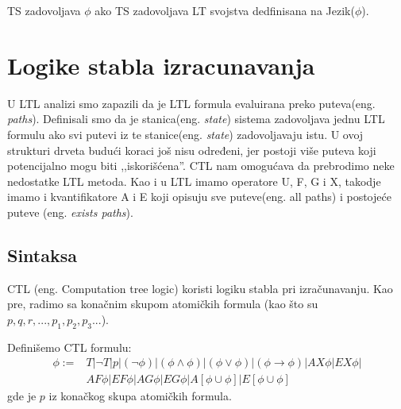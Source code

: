 \documentclass[a4paper]{article}
\begin{document}
{	TS zadovoljava $\phi$ ako TS zadovoljava LT svojstva dedfinisana na Jezik($\phi$).


	\section{Logike stabla izracunavanja}
	\label{sec:CTL}
	U LTL analizi smo zapazili da je LTL formula evaluirana preko puteva(eng. \emph{paths}). Definisali smo da je stanica(eng. \emph{state}) sistema
	zadovoljava jednu LTL formulu ako svi putevi iz te stanice(eng. \emph{state}) zadovoljavaju istu. U ovoj strukturi drveta budući koraci još nisu
	određeni, jer postoji više puteva koji potencijalno mogu biti ,,iskorišćena''.
	CTL nam omogućava da prebrodimo neke nedostatke LTL metoda. Kao i u LTL imamo operatore U, F, G i X, takodje imamo i kvantifikatore
	A i E koji opisuju sve puteve(eng. all paths) i postojeće puteve (eng. \emph{exists paths}). 

\subsection{Sintaksa}
	\label{subsec:podnaslovN}
CTL (eng. Computation tree logic) koristi logiku stabla pri izračunavanju. 
	Kao pre, radimo sa konačnim skupom atomičkih formula (kao što su $p, q, r,...,p_1,p_2,p_3...$).

	Definišemo CTL formulu:
\begin{equation}
\begin{split}
\phi := &T | \neg T | p | (\neg \phi) | (\phi \wedge \phi) | (\phi \vee \phi) | (\phi \rightarrow \phi)| AX\phi | EX\phi | \\
          &  AF\phi | EF\phi | AG\phi | EG\phi | A[\phi \cup \phi] | E[\phi \cup \phi]
\end{split}
\end{equation}
	gde je $p$ iz konačkog skupa atomičkih formula.
	\newline
	
}
\end{document}
